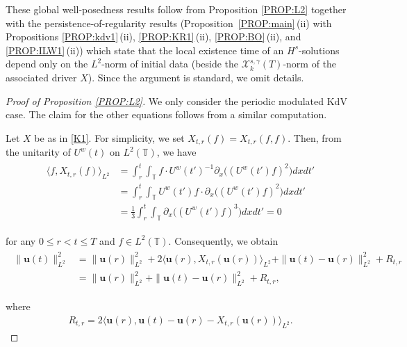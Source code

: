 \documentclass[letterpaper, 11pt,  reqno]{amsart}
\newcommand{\1}{\hspace{0.5mm}\text{I}\hspace{0.5mm}}
\newcommand{\noi}{\noindent}
\newcommand{\T}{\mathbb{T}}
\newcommand{\g}{\gamma}
\newcommand{\dx}{\partial_x}
\newcommand{\jb}[1]
{\langle #1 \rangle}
\newcommand{\cX}{\mathcal{X}}
\newcommand{\uw}{U^w}
\newcommand{\uu}{\mathbf{u}}
\numberwithin{equation}{section}
\numberwithin{theorem}{section}
\begin{document}
  
  \noi
These global well-posedness results
follow from Proposition \ref{PROP:L2}
together with 
 the persistence-of-regularity results (Proposition~\ref{PROP:main}\,(ii)
with 
Propositions \ref{PROP:kdv1}\,(ii), 
 \ref{PROP:KR1}\,(ii), 
 \ref{PROP:BO}\,(ii), 
and  \ref{PROP:ILW1}\,(ii))
which state that the local existence
time of an $H^s$-solutions depend
only on the $L^2$-norm of initial data
(beside the $\cX^{s, \g}_k(T)$-norm of the associated driver $X$).
Since the argument is standard, we omit details.


\begin{proof}[Proof of Proposition \ref{PROP:L2}]

We only consider the periodic modulated KdV case.
The claim for the other equations follows 
from a similar computation.


Let $X$ be as in 
\eqref{K1}.
For simplicity, we set $X_{t, r}(f) = X_{t, r}(f, f)$.
Then, 
from the unitarity of $\uw(t)$ on $L^2(\T)$, 
we have 
\begin{align}
\begin{split}
\jb{f, X_{t,r}(f)  }_{L^2}
&=\int_{r}^{t} 
\int_{\T}  f\cdot 
 \uw(t')^{-1}  
\dx \big((\uw(t') f)^2 \big) 
dx  dt'\\
&=\int_{r}^{t}
 \int_{\T}   \uw(t')  f \cdot 
  \dx \big((\uw(t') f)^2\big)   dxdt'
\\&=\frac 13 \int_{r}^{t} \int_{\T}
  \dx \big((\uw(t') f)^3\big)
   dx dt'=0
\end{split}
\label{GK0}
\end{align}


\noi
for any  $0\leq r<t\leq T$ and $f \in L^2(\T)$.
Consequently,
we obtain 
\begin{align}
\label{GK1}
\begin{aligned}
\| \uu(t) \|^2_{L^2}
&=\|  \uu(r)  \|_{L^2}^2
+2\big\langle \uu(r),X_{t,r}(\uu(r)) 
\big\rangle_{L^2}
 +  \|  \uu(t) -\uu(r)  \|^2_{L^2}+R_{t,r}\\
&=\|  \uu(r)  \|^2_{L^2} +
\|   \uu(t)-\uu(r)   \|^2_{L^2}
+R_{t,r},
\end{aligned}
\end{align}



\noi
where 
\begin{align*}
R_{t,r}=2\big\langle 
\uu(r) ,  \uu(t)-  \uu(r) -X_{t,r}(\uu(r))\big\rangle_{L^2}. 
\end{align*}



\end{proof}
\end{document}
